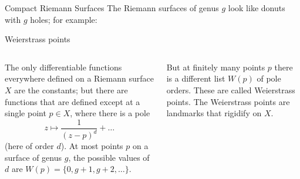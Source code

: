 \documentclass[12pt, aspectratio=169]{beamer}
\begin{document}
\begin{frame}{Compact Riemann Surfaces}
The Riemann surfaces of \alert{genus $g$} look like donuts with $g$ holes; for example:
\end{frame}


\begin{frame}{Weierstrass points}
\begin{columns}
 The only differentiable functions
 everywhere defined on a Riemann surface $X$ are the constants;
 but there are functions that are defined except
 at a \alert{single point} $p\in X$, where there is a pole 
 $$
 z\mapsto \frac{1}{(z-p)^d} + \dots
 $$
 (here of order $d$). At most points $p$ on a surface of
 genus $g$, the possible values of $d$ are
$W(p) = \{0, g+1,g+2,\dots\}$.

But at finitely many points $p$
there is a different list $W(p)$ of pole orders. These are called \alert{Weierstrass points}.
The Weierstrass points are landmarks that rigidify on $X$.
\end{columns}
 \end{frame}
\end{document}
